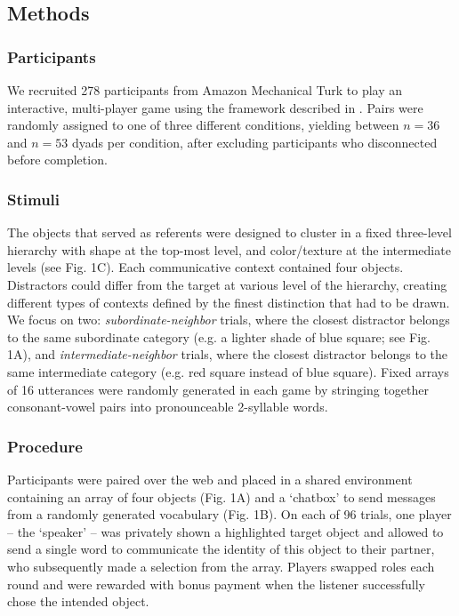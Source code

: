 \documentclass[10pt,letterpaper]{article}
\begin{document}
\subsection{Methods}
\subsubsection{Participants}

We recruited 278 participants from Amazon Mechanical Turk to play an interactive, multi-player game using the framework described in . Pairs were randomly assigned to one of three different conditions, yielding between $n=36$ and $n=53$ dyads per condition, after excluding participants who disconnected before completion.

\subsubsection{Stimuli}
The objects that served as referents were designed to cluster in a fixed three-level hierarchy with shape at the top-most level, and color/texture at the intermediate levels (see Fig. 1C). Each communicative context contained four objects. Distractors could differ from the target at various level of the hierarchy, creating different types of contexts defined by the finest distinction that had to be drawn. We focus on two: \emph{subordinate-neighbor} trials, where the closest distractor belongs to the same subordinate category (e.g. a lighter shade of blue square; see Fig. 1A), and \emph{intermediate-neighbor} trials, where the closest distractor belongs to the same intermediate category (e.g. red square instead of blue square). Fixed arrays of 16 utterances were randomly generated in each game by stringing together consonant-vowel pairs into pronounceable 2-syllable words.

\subsubsection{Procedure}
Participants were paired over the web and placed in a shared environment containing an array of four objects (Fig. 1A) and a `chatbox' to send messages from a randomly generated vocabulary (Fig. 1B). On each of 96 trials, one player -- the `speaker' -- was privately shown a highlighted target object and allowed to send a single word to communicate the identity of this object to their partner, who subsequently made a selection from the array. Players swapped roles each round and were rewarded with bonus payment when the listener successfully chose the intended object.
\end{document}
